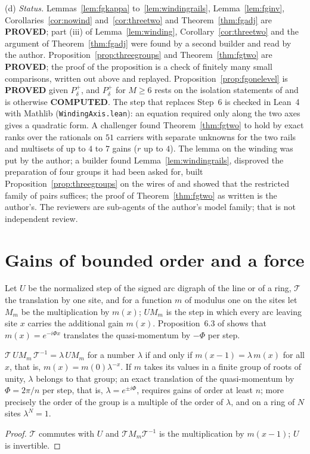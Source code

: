 \begin{remark}
(d) \emph{Status.} Lemmas~\ref{lem:fgkappa} to~\ref{lem:windingrails}, Lemma~\ref{lem:fginv}, Corollaries~\ref{cor:nowind} and~\ref{cor:threetwo} and Theorem~\ref{thm:fgadj} are \textbf{PROVED}; part (iii) of Lemma~\ref{lem:winding}, Corollary~\ref{cor:threetwo} and the argument of Theorem~\ref{thm:fgadj} were found by a second builder and read by the author. Proposition~\ref{prop:threegroups} and Theorem~\ref{thm:fgtwo} are \textbf{PROVED}; the proof of the proposition is a check of finitely many small comparisons, written out above and replayed. Proposition~\ref{prop:fgonelevel} is \textbf{PROVED} given $P^{+}_\delta$, and $P^{+}_\delta$ for $M\ge6$ rests on the isolation statements of \cite{dgone} and is otherwise \textbf{COMPUTED}. The step that replaces Step~6 is checked in Lean~4 with Mathlib (\texttt{WindingAxis.lean}): an equation required only along the two axes gives a quadratic form. A challenger found Theorem~\ref{thm:fgtwo} to hold by exact ranks over the rationals on $51$ carriers with separate unknowns for the two rails and multisets of up to $4$ to $7$ gains ($r$ up to $4$). The lemma on the winding was put by the author; a builder found Lemma~\ref{lem:windingrails}, disproved the preparation of four groups it had been asked for, built Proposition~\ref{prop:threegroups} on the wires of \cite{dgone} and showed that the restricted family of pairs suffices; the proof of Theorem~\ref{thm:fgtwo} as written is the author's. The reviewers are sub-agents of the author's model family; that is not independent review.
\end{remark}

\section{Gains of bounded order and a force}\label{sec:force}

Let $U$ be the normalized step of the signed arc digraph of the line or of a ring, $\mathcal{T}$ the translation by one site, and for a function $m$ of modulus one on the sites let $M_m$ be the multiplication by $m(x)$; $UM_m$ is the step in which every arc leaving site $x$ carries the additional gain $m(x)$. Proposition~6.3 of \cite{g9} shows that $m(x)=e^{-i\Phi x}$ translates the quasi-momentum by $-\Phi$ per step.

\begin{proposition}\label{prop:exact}
$\mathcal{T}\,UM_m\,\mathcal{T}^{-1}=\lambda\,UM_m$ for a number $\lambda$ if and only if $m(x-1)=\lambda\,m(x)$ for all $x$, that is, $m(x)=m(0)\lambda^{-x}$. If $m$ takes its values in a finite group of roots of unity, $\lambda$ belongs to that group; an exact translation of the quasi-momentum by $\Phi=2\pi/n$ per step, that is, $\lambda=e^{\pm i\Phi}$, requires gains of order at least $n$; more precisely the order of the group is a multiple of the order of $\lambda$, and on a ring of $N$ sites $\lambda^N=1$.
\end{proposition}
\begin{proof}
$\mathcal{T}$ commutes with $U$ and $\mathcal{T}M_m\mathcal{T}^{-1}$ is the multiplication by $m(x-1)$; $U$ is invertible.
\end{proof}

